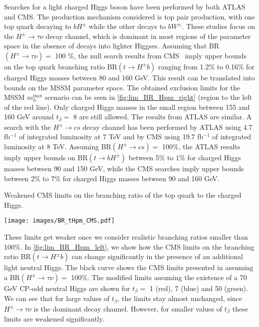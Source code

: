 Searches for a light charged Higgs boson have been performed by both ATLAS and CMS. The production mechanism considered is top pair production, with one top quark decaying to $bH^{\pm} $ while the other decays to $bW^\pm$. These studies focus on the $H^{\pm} \rightarrow \tau \nu$ decay channel, which is dominant in most regions of the parameter space in the absence of decays into lighter Higgses. Assuming that  BR$(H^{\pm} \rightarrow \tau \nu) =$ 100 \%, the null search results from CMS~\cite{CMS:2014cdp} imply upper bounds on the top quark branching ratio BR$(t \rightarrow H^{\pm} b)$ ranging from 1.2\% to 0.16\% for charged Higgs masses between 80 and 160 GeV. This result can be translated into bounds on the MSSM parameter space. The obtained exclusion limits for the MSSM $m_h^\text{max}$ scenario can be seen in \autoref{fig:lim_BR_Hpm_right} (region to the left of the red line). Only charged Higgs masses in the small region between 155 and 160 GeV around $t_{\beta} =$ 8 are still allowed. The results from ATLAS \cite{TheATLAScollaboration:2013wia} are similar.
A search with the $H^{\pm} \rightarrow cs$ decay channel has been performed by ATLAS \cite{Aad:2013hla} using 4.7 fb$^{-1}$ of integrated luminosity at 7 TeV and by CMS \cite{CMS:2014kga} using 19.7 fb$^{-1}$ of integrated luminosity at 8 TeV. Assuming BR$(H^{\pm} \rightarrow c s) =$ 100\%, the ATLAS results imply upper bounds on BR$(t \rightarrow b H^{\pm} )$ between 5\% to 1\% for charged Higgs masses between 90 and 150 GeV, while the CMS searches imply upper bounds between 2\% to 7\% for charged Higgs masses between 90 and 160 GeV.
\begin{marginfigure}[-15cm]
    \caption{Weakened CMS limits on the branching ratio of the top quark to the charged Higgs.}
 	\texttt{[image: images/BR\_tHpm\_CMS.pdf]}
\label{fig:lim_BR_Hpm_left}
\end{marginfigure}
These limits get weaker once we consider realistic branching ratios smaller than 100\%. In \autoref{fig:lim_BR_Hpm_left}, we show how the CMS limits on the branching ratio BR$(t \rightarrow H^{\pm} b)$ can change significantly in the presence of an additional light neutral Higgs. The black curve shows the CMS limits presented in \cite{CMS:2014cdp} assuming a BR$(H^{\pm} \rightarrow \tau \nu) =$ 100\%. The modified limits assuming the existence of a 70 GeV CP-odd neutral Higgs are shown for $t_{\beta}=$ 1 (red), 7 (blue) and 50 (green). We can see that for large values of $t_{\beta}$, the limits stay almost unchanged, since $H^{\pm} \rightarrow \tau \nu$ is the dominant decay channel. However, for smaller values of $t_{\beta}$ these limits are weakened significantly.
